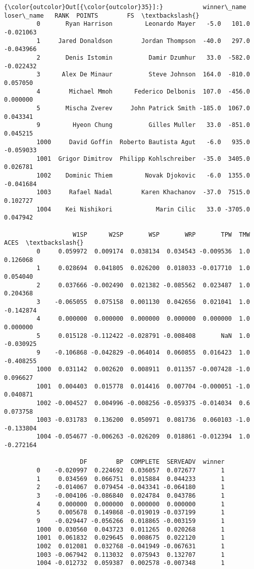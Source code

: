 \documentclass[11pt]{article}
\begin{document}
\begin{Verbatim}[commandchars=\\\{\}]
{\color{outcolor}Out[{\color{outcolor}35}]:}           winner\_name             loser\_name   RANK  POINTS        FS  \textbackslash{}
         0       Ryan Harrison         Leonardo Mayer   -5.0   101.0 -0.021063   
         1     Jared Donaldson        Jordan Thompson  -40.0   297.0 -0.043966   
         2       Denis Istomin          Damir Dzumhur   33.0  -582.0 -0.022432   
         3      Alex De Minaur          Steve Johnson  164.0  -810.0  0.057050   
         4        Michael Mmoh      Federico Delbonis  107.0  -456.0  0.000000   
         5       Mischa Zverev     John Patrick Smith -185.0  1067.0  0.043341   
         9         Hyeon Chung          Gilles Muller   33.0  -851.0  0.045215   
         1000     David Goffin  Roberto Bautista Agut   -6.0   935.0 -0.059033   
         1001  Grigor Dimitrov  Philipp Kohlschreiber  -35.0  3405.0  0.026781   
         1002    Dominic Thiem         Novak Djokovic   -6.0  1355.0 -0.041684   
         1003     Rafael Nadal        Karen Khachanov  -37.0  7515.0  0.102727   
         1004    Kei Nishikori            Marin Cilic   33.0 -3705.0  0.047942   
         
                   W1SP      W2SP       WSP       WRP       TPW  TMW      ACES  \textbackslash{}
         0     0.059972  0.009174  0.038134  0.034543 -0.009536  1.0  0.126068   
         1     0.028694  0.041805  0.026200  0.018033 -0.017710  1.0  0.054040   
         2     0.037666 -0.002490  0.021382 -0.085562  0.023487  1.0  0.204368   
         3    -0.065055  0.075158  0.001130  0.042656  0.021041  1.0 -0.142874   
         4     0.000000  0.000000  0.000000  0.000000  0.000000  1.0  0.000000   
         5     0.015128 -0.112422 -0.028791 -0.008408       NaN  1.0 -0.030925   
         9    -0.106868 -0.042829 -0.064014  0.060855  0.016423  1.0 -0.408255   
         1000  0.031142  0.002620  0.008911  0.011357 -0.007428 -1.0  0.096627   
         1001  0.004403  0.015778  0.014416  0.007704 -0.000051 -1.0  0.040871   
         1002 -0.004527  0.004996 -0.008256 -0.059375 -0.014034  0.6  0.073758   
         1003 -0.031783  0.136200  0.050971  0.081736  0.060103 -1.0 -0.133804   
         1004 -0.054677 -0.006263 -0.026209  0.018861 -0.012394  1.0 -0.272164   
         
                     DF        BP  COMPLETE  SERVEADV  winner  
         0    -0.020997  0.224692  0.036057  0.072677       1  
         1     0.034569  0.066751  0.015884  0.044233       1  
         2    -0.014067  0.079454 -0.043341 -0.064180       1  
         3    -0.004106 -0.086840  0.024784  0.043786       1  
         4     0.000000  0.000000  0.000000  0.000000       1  
         5     0.005678  0.149868 -0.019019 -0.037199       1  
         9    -0.029447 -0.056266  0.018865 -0.003159       1  
         1000  0.030560  0.043723  0.011265  0.020268       1  
         1001  0.061832  0.029645  0.008675  0.022120       1  
         1002  0.012081  0.032768 -0.041949 -0.067631       1  
         1003 -0.067942  0.113032  0.075943  0.132707       1  
         1004 -0.012732  0.059387  0.002578 -0.007348       1  
\end{Verbatim}
            
\end{document}
